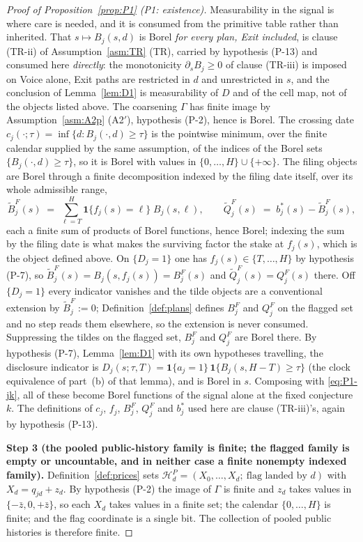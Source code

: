 \documentclass[11pt]{article}
\newcommand{\ind}{\mathbf{1}}
\begin{document}
\begin{proof}[Proof of Proposition~\ref{prop:P1} (P1: existence)]
Measurability in the signal is where care is needed, and it is consumed from the primitive table
rather than inherited. That $s \mapsto B_j(s,d)$ is Borel \emph{for every plan, Exit included}, is
clause (TR-ii) of Assumption~\ref{asm:TR} (TR), carried by hypothesis (P-13) and consumed here
\emph{directly}: the monotonicity $\partial_s B_j \ge 0$ of clause (TR-iii) is imposed on Voice
alone, Exit paths are restricted in $d$ and unrestricted in $s$, and the conclusion of
Lemma~\ref{lem:D1} is measurability of $D$ and of the cell map, not of the objects listed above. The
coarsening $\Gamma$ has finite image by Assumption~\ref{asm:A2p} (A2$'$), hypothesis (P-2), hence is Borel.
The crossing date $c_j(\cdot;\tau) = \inf\{d : B_j(\cdot,d) \ge \tau\}$ is the pointwise minimum,
over the finite calendar supplied by the same assumption, of the indices of the Borel sets
$\{B_j(\cdot,d) \ge \tau\}$, so it is Borel with values in $\{0,\dots,H\} \cup \{+\infty\}$. The
filing objects are Borel through a finite decomposition indexed by the filing date itself, over its
whole admissible range,
\begin{equation}
\label{eq:P1-BF}
\widetilde B_j^F(s) \;=\; \sum_{\ell=T}^{H} \ind\{f_j(s) = \ell\}\; B_j(s,\ell),
\qquad
\widetilde Q_j^F(s) \;=\; b_j^*(s) - \widetilde B_j^F(s),
\end{equation}
each a finite sum of products of Borel functions, hence Borel; indexing the sum by the filing date is
what makes the surviving factor the stake at $f_j(s)$, which is the object defined above. On
$\{D_j = 1\}$ one has $f_j(s) \in \{T,\dots,H\}$ by hypothesis (P-7), so
$\widetilde B_j^F(s) = B_j(s,f_j(s)) = B_j^F(s)$ and $\widetilde Q_j^F(s) = Q_j^F(s)$ there. Off
$\{D_j = 1\}$ every indicator vanishes and the tilde objects are a conventional extension by
$\widetilde B_j^F := 0$; Definition~\ref{def:plans} defines $B_j^F$ and $Q_j^F$ on the flagged set and
no step reads them elsewhere, so the extension is never consumed. Suppressing the tildes on the
flagged set, $B_j^F$ and $Q_j^F$ are Borel there. By hypothesis (P-7), Lemma~\ref{lem:D1} with its own
hypotheses travelling, the disclosure indicator is $D_j(s;\tau,T) = \ind\{a_j = 1\}\,\ind\{B_j(s,H-T)
\ge \tau\}$ (the clock equivalence of part~(b) of that lemma), and is Borel in $s$. Composing with
\eqref{eq:P1-jk}, all of these become Borel functions of the signal alone at the fixed conjecture
$k$. The definitions of $c_j$, $f_j$, $B_j^F$, $Q_j^F$ and $b_j^*$ used here are clause (TR-iii)'s,
again by hypothesis (P-13).

\smallskip
\noindent\textbf{Step 3 (the pooled public-history family is finite; the flagged family is empty or
uncountable, and in neither case a finite nonempty indexed family).}
Definition~\ref{def:prices} sets $\mathcal H_d^P = (X_0,\dots,X_d;\ \text{flag landed by } d)$ with
$X_d = q_{jd}+z_d$. By hypothesis (P-2) the image of $\Gamma$ is finite and $z_d$ takes values in
$\{-\bar z,0,+\bar z\}$, so each $X_d$ takes values in a finite set; the calendar
$\{0,\dots,H\}$ is finite; and the flag coordinate is a single bit. The collection of pooled public
histories is therefore finite.


\end{proof}
\end{document}
